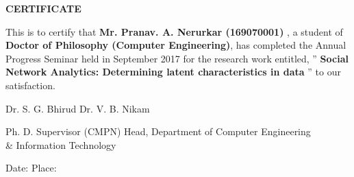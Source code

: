 \documentclass[oneside,11pt]{Classes/CUEDthesisPSnPDF}
\theoremstyle{definition}
\begin{document}
\setcounter{secnumdepth}{3}
\setcounter{tocdepth}{3}
\renewcommand{\chaptermark}[1]{\markboth{#1}{}}
\renewcommand{\sectionmark}[1]{\markright{#1}{}}
\rhead{} \chead{} \lhead{\leftmark} \rfoot{\footnotesize \thepage} \cfoot{} 
\frontmatter %
\begin{titlepage}

\vspace*{1\baselineskip}
\vspace*{1\baselineskip}
 \begin{center} \begin{Huge} \textbf{CERTIFICATE}\end{Huge} \end{center} 
\vspace*{1\baselineskip}\vspace*{1\baselineskip} 

This is to certify that \textbf{Mr. Pranav. A. Nerurkar (169070001)} , a student of \textbf{Doctor of Philosophy (Computer Engineering)},
has completed the Annual Progress Seminar held in September 2017 for the research work entitled,  
”
\textbf{Social Network Analytics: Determining latent characteristics in data}
” to our
satisfaction. 

\vspace*{13\baselineskip}
\begin{center}
Dr. S. G. Bhirud   \hspace{2in}          Dr. V. B. Nikam                              

\hspace{0.2in} Ph. D. Supervisor (CMPN)     \hspace{0.5in}      Head, Department of Computer Engineering \\ 
\hspace{3in} \& Information Technology   

\end{center}

\vspace*{1\baselineskip}
\vspace*{1\baselineskip}

\begin{center}
Date:      \hspace{3in}      Place:                              

 
\end{center}
\end{titlepage}
\end{document}
